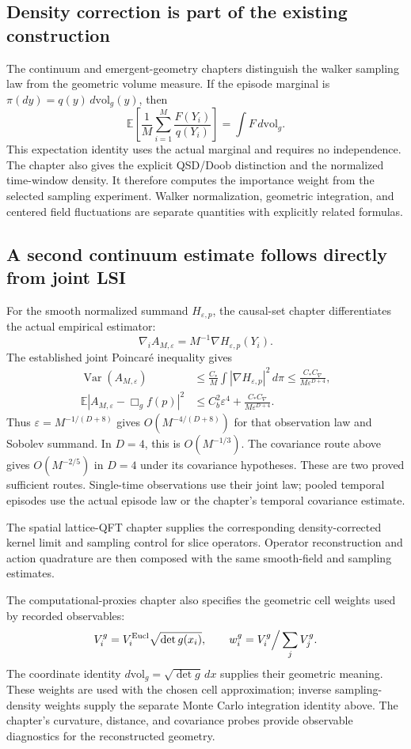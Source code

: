 \documentclass[11pt,a4paper]{article}
\newcommand{\Var}{\operatorname{Var}}
\begin{document}
\subsection*{Density correction is part of the existing construction}
The continuum and emergent-geometry chapters distinguish the walker sampling law from the geometric volume measure. If the episode marginal is \(\pi(dy)=q(y)\,d\mathrm{vol}_g(y)\), then
\[
\mathbb E\left[\frac1M\sum_{i=1}^{M}\frac{F(Y_i)}{q(Y_i)}\right]
=\int F\,d\mathrm{vol}_g.
\]
This expectation identity uses the actual marginal and requires no independence. The chapter also gives the explicit QSD/Doob distinction and the normalized time-window density. It therefore computes the importance weight from the selected sampling experiment. Walker normalization, geometric integration, and centered field fluctuations are separate quantities with explicitly related formulas.

\subsection*{A second continuum estimate follows directly from joint LSI}
For the smooth normalized summand \(H_{\varepsilon,p}\), the causal-set chapter differentiates the actual empirical estimator:
\[
\nabla_i A_{M,\varepsilon}=M^{-1}\nabla H_{\varepsilon,p}(Y_i).
\]
The established joint Poincar\'e inequality gives
\begin{align*}
\Var(A_{M,\varepsilon})
&\le\frac{C_*}{M}\int|\nabla H_{\varepsilon,p}|^2\,d\pi
\le\frac{C_*C_\nabla}{M\varepsilon^{D+4}},\\
\mathbb E|A_{M,\varepsilon}-\Box_gf(p)|^2
&\le C_b^2\varepsilon^4+
\frac{C_*C_\nabla}{M\varepsilon^{D+4}}.
\end{align*}
Thus \(\varepsilon=M^{-1/(D+8)}\) gives \(O(M^{-4/(D+8)})\) for that observation law and Sobolev summand. In \(D=4\), this is \(O(M^{-1/3})\). The covariance route above gives \(O(M^{-2/5})\) in \(D=4\) under its covariance hypotheses. These are two proved sufficient routes. Single-time observations use their joint law; pooled temporal episodes use the actual episode law or the chapter's temporal covariance estimate.

The spatial lattice-QFT chapter supplies the corresponding density-corrected kernel limit and sampling control for slice operators. Operator reconstruction and action quadrature are then composed with the same smooth-field and sampling estimates.

The computational-proxies chapter also specifies the geometric cell weights used by recorded observables:
\[
V_i^g=V_i^{\rm Eucl}\sqrt{\det g(x_i)},\qquad
w_i^g=V_i^g\Big/\sum_jV_j^g.
\]
The coordinate identity \(d\mathrm{vol}_g=\sqrt{\det g}\,dx\) supplies their geometric meaning. These weights are used with the chosen cell approximation; inverse sampling-density weights supply the separate Monte Carlo integration identity above. The chapter's curvature, distance, and covariance probes provide observable diagnostics for the reconstructed geometry.
\end{document}
